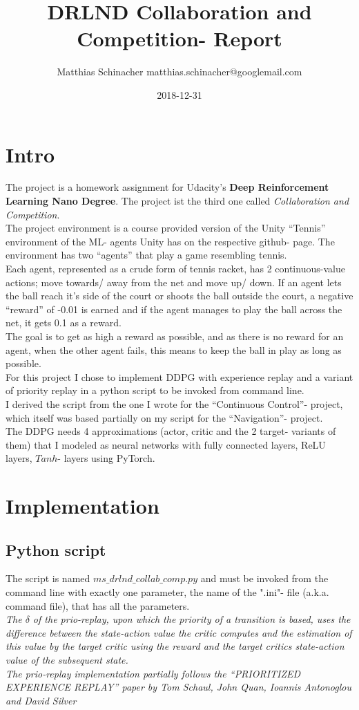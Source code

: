 \documentclass[a4paper]{article}
\title{DRLND Collaboration and Competition- Report}
\date{2018-12-31}
\author{Matthias Schinacher matthias.schinacher@googlemail.com}
\begin{document}
\maketitle
\tableofcontents
\newpage

\section{Intro}
The project is a homework assignment for Udacity's \textbf{Deep Reinforcement Learning Nano Degree}.
The project ist the third one called \textit{Collaboration and Competition}.
\\
The project environment is a course provided version of the Unity \enquote{Tennis}
environment of the ML- agents Unity has on the respective github- page.
The environment has two \enquote{agents} that play a game resembling tennis.
\\
Each agent, represented as a crude form of tennis racket, has 2 continuous-value actions;
move towards/ away from the net and move up/ down. If an agent lets the ball
reach it's side of the court or shoots the ball outside the court, a negative
\enquote{reward} of -0.01 is earned and if the agent manages to play the ball
across the net, it gets 0.1 as a reward.
\\
The goal is to get as high a reward as possible, and as there is no reward
for an agent, when the other agent fails, this means to keep the ball in play
as long as possible.
\\
For this project I chose to implement DDPG with experience replay and
a variant of priority replay in a python script to be invoked from command line.
\\
I derived the script from the one I wrote for the \enquote{Continuous Control}- project,
which itself was based partially on my script for the \enquote{Navigation}- project.
\\
The DDPG needs 4 approximations (actor, critic and the 2 target- variants of them)
that I modeled as neural networks with fully connected layers, ReLU layers,
$Tanh$- layers using PyTorch.

\section{Implementation}
\subsection{Python script}
The script is named $ms\_drlnd\_collab\_comp.py$ and must be invoked from the command
line with exactly one parameter, the name of the ".ini"- file (a.k.a. command file),
that has all the parameters.
\\
\textit{The $\delta$ of the prio-replay, upon which the priority of a transition
is based, uses the difference between the state-action value the critic
computes and the estimation of this value by the target critic using the reward
and the target critics state-action value of the subsequent state.\\
The prio-replay implementation partially follows the \enquote{PRIORITIZED EXPERIENCE REPLAY}
paper by Tom Schaul, John Quan, Ioannis Antonoglou and David Silver}
\end{document}
